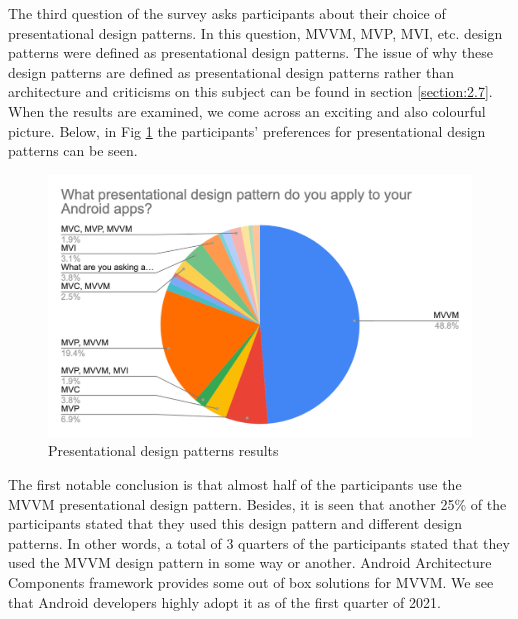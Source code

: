 The third question of the survey asks participants about their choice of presentational design patterns. In this question, MVVM, MVP, MVI, etc. design patterns were defined as presentational design patterns. The issue of why these design patterns are defined as presentational design patterns rather than architecture and criticisms on this subject can be found in section \ref{section:2.7}. When the results are  examined, we come across an exciting and also colourful picture. Below, in Fig \ref{fig:design_pattern} the participants' preferences for presentational design patterns can be seen.
\begin{figure}[ht!]
    \centering
    \includegraphics[scale=0.3]{figures/design_pattern.png}
    \caption{Presentational design patterns results}
    \label{fig:design_pattern}
\end{figure}
\FloatBarrier
The first notable conclusion is that almost half of the participants use the MVVM presentational design pattern. Besides, it is seen that another 25\% of the participants stated that they used this design pattern and different design patterns. In other words, a total of 3 quarters of the participants stated that they used the MVVM design pattern in some way or another. Android Architecture Components framework provides some out of box solutions for MVVM. We see that Android developers highly adopt it as of the first quarter of 2021. 

